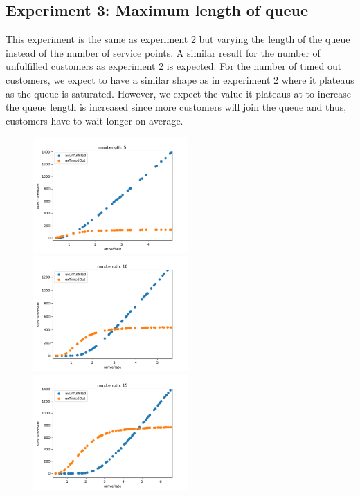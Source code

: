 \documentclass{article}
\begin{document}
\subsection{Experiment 3: Maximum length of queue}
This experiment is the same as experiment 2 but varying the length of the queue instead of the number of service points. A similar result for the number of unfulfilled customers as experiment 2 is expected. For the number of timed out customers, we expect to have a similar shape as in experiment 2 where it plateaus as the queue is saturated. However, we expect the value it plateaus at to increase the queue length is increased since more customers will join the queue and thus, customers have to wait longer on average.
\begin{figure}[h]
\includegraphics[width=5.9cm]{maxLen_5.png}
\includegraphics[width=5.9cm]{maxLen_10.png}
\includegraphics[width=5.9cm]{maxLen_15.png}
\end{figure}
\end{document}
